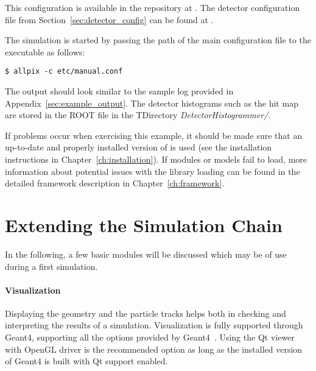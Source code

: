 This configuration is available in the repository at .
The detector configuration file from Section~\ref{sec:detector_config} can be found at .

The simulation is started by passing the path of the main configuration file to the  executable as follows:
\begin{verbatim}
$ allpix -c etc/manual.conf
\end{verbatim}
The output should look similar to the sample log provided in Appendix~\ref{sec:example_output}.
The detector histograms such as the hit map are stored in the ROOT file  in the TDirectory \textit{DetectorHistogrammer/}.

If problems occur when exercising this example, it should be made sure that an up-to-date and properly installed version of \apsq is used (see the installation instructions in Chapter~\ref{ch:installation}).
If modules or models fail to load, more information about potential issues with the library loading can be found in the detailed framework description in Chapter~\ref{ch:framework}.

\section{Extending the Simulation Chain}
In the following, a few basic modules will be discussed which may be of use during a first simulation.

\paragraph{Visualization}
Displaying the geometry and the particle tracks helps both in checking and interpreting the results of a simulation.
Visualization is fully supported through Geant4, supporting all the options provided by Geant4~\cite{geant4vis}.
Using the Qt viewer with OpenGL driver is the recommended option as long as the installed version of Geant4 is built with Qt support enabled.


